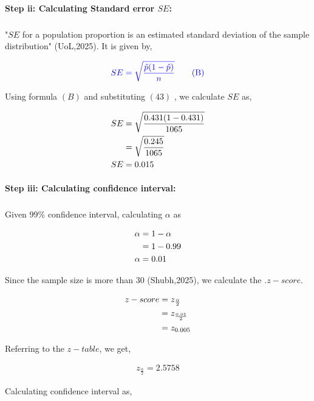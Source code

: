 \documentclass[a4paper]{report}
\begin{document}
\paragraph{Step ii: Calculating Standard error $SE$:}

\subparagraph*{}


"$SE$ for a population proportion is an estimated standard deviation of the sample distribution" (UoL,2025). It is given by,

\begin{equation*}
    \color{blue} SE=\sqrt{\frac{\hat{p}(1-\hat{p})}{n}} \tag{B}
\end{equation*}

\newpage Using formula $(B)$ and substituting $(43)$ , we calculate $SE$ as,

\begin{align}
    \notag SE &=\sqrt{\frac{0.431(1-0.431)}{1065}} \\ \notag &=\sqrt{\frac{0.245}{1065}} \\
    SE &=0.015
\end{align}

\paragraph{Step iii: Calculating confidence interval:}

\subparagraph*{}

Given $99\%$ confidence interval, calculating $\alpha$ as

\begin{align}
    \notag \alpha &= 1-\alpha \\
    \notag  &=1-0.99 \\
    \alpha&=0.01
\end{align}

Since the sample size is more than $30$ (Shubh,2025), we calculate the .$z-score$.

\begin{align}
    \notag z-score&=z_{\frac{\alpha}{2}} \\
    \notag &=z_{\frac{0.01}{2}} \\
    &=z_{0.005}
\end{align}

Referring to the $z-table$, we get,

\begin{align}
    z_{\frac{\alpha}{2}}=2.5758
\end{align}

Calculating confidence interval as,
\end{document}
